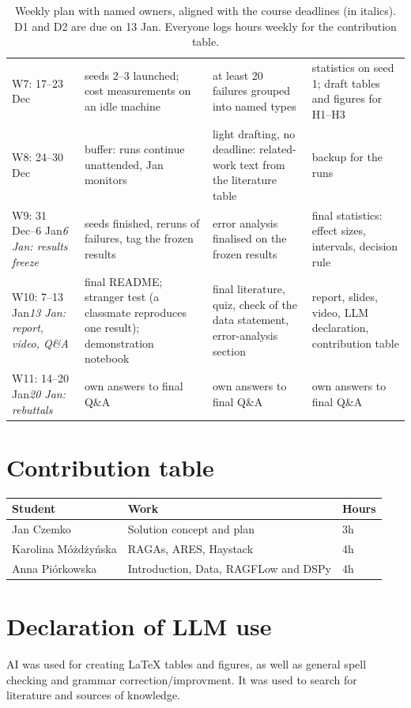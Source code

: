 \documentclass[11pt]{article}
\begin{document}
\begin{table}[t]
\begin{tabular}{@{}>{\raggedright\arraybackslash}p{2.7cm}>{\raggedright\arraybackslash}p{4.1cm}>{\raggedright\arraybackslash}p{4.1cm}>{\raggedright\arraybackslash}p{4.1cm}@{}}
\addlinespace
W7: 17--23 Dec & seeds 2--3 launched; cost measurements on an idle machine & at least 20 failures grouped into named types & statistics on seed 1; draft tables and figures for H1--H3\\
\addlinespace
W8: 24--30 Dec & buffer: runs continue unattended, Jan monitors & light drafting, no deadline: related-work text from the literature table & backup for the runs\\
\addlinespace
W9: 31 Dec--6 Jan\newline\textit{6 Jan: results freeze} & seeds finished, reruns of failures, tag the frozen results & error analysis finalised on the frozen results & final statistics: effect sizes, intervals, decision rule\\
\addlinespace
W10: 7--13 Jan\newline\textit{13 Jan: report, video, Q\&A} & final README; stranger test (a classmate reproduces one result); demonstration notebook & final literature, quiz, check of the data statement, error-analysis section & report, slides, video, LLM declaration, contribution table\\
\addlinespace
W11: 14--20 Jan\newline\textit{20 Jan: rebuttals} & own answers to final Q\&A & own answers to final Q\&A & own answers to final Q\&A\\
\bottomrule
\end{tabular}
\caption{Weekly plan with named owners, aligned with the course deadlines (in italics). D1 and D2 are due on 13 Jan. Everyone logs hours weekly for the contribution table.}
\label{tab:plan}
\end{table}


\section{Contribution table}
\begin{tabular}{ |p{3cm}|p{3cm}|p{1cm}| } 
\hline
Student & Work & Hours \\
\hline
Jan Czemko & Solution concept and plan & 3h \\ 
Karolina Móżdżyńska & RAGAs, ARES, Haystack & 4h \\ 
Anna Piórkowska & Introduction, Data, RAGFLow and DSPy & 4h \\ 
\hline
\end{tabular}

\section{Declaration of LLM use}
AI was used for creating LaTeX tables and figures, as well as general spell checking and grammar correction/improvment. It was used to search for literature and sources of knowledge.
\end{document}
